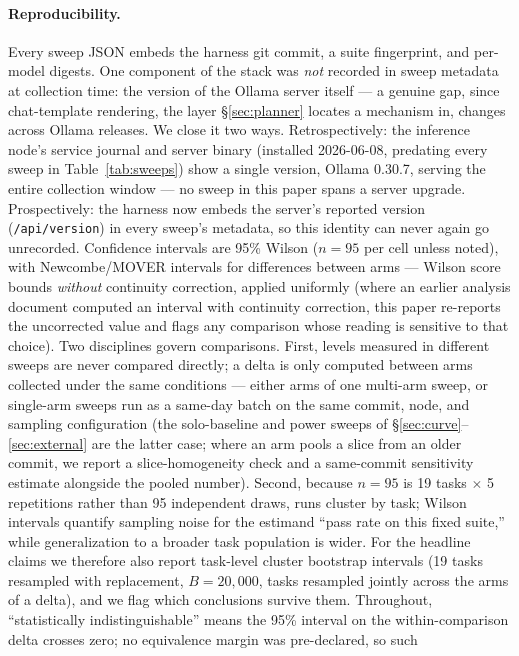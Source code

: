 \documentclass[smallcondensed,natbib]{svjour3}
\begin{document}
\paragraph{Reproducibility.} Every sweep JSON embeds the harness git
commit, a suite fingerprint, and per-model digests. One component of
the stack was \emph{not} recorded in sweep metadata at collection
time: the version of the Ollama server itself --- a genuine gap, since
chat-template rendering, the layer \S\ref{sec:planner} locates a
mechanism in, changes across Ollama releases. We close it two ways.
Retrospectively: the inference node's service journal and server
binary (installed 2026-06-08, predating every sweep in
Table~\ref{tab:sweeps}) show a single version, Ollama 0.30.7, serving
the entire collection window --- no sweep in this paper spans a server
upgrade. Prospectively: the harness now embeds the server's reported
version (\texttt{/api/version}) in every sweep's metadata, so this
identity can never again go unrecorded. Confidence
intervals are 95\% Wilson ($n{=}95$ per cell unless noted), with
Newcombe/MOVER intervals for differences between arms --- Wilson score
bounds \emph{without} continuity correction, applied uniformly (where
an earlier analysis document computed an interval with continuity
correction, this paper re-reports the uncorrected value and flags any
comparison whose reading is sensitive to that choice). Two disciplines
govern comparisons. First, levels measured in different sweeps are
never compared directly; a delta is only computed between arms
collected under the same conditions --- either arms of one multi-arm
sweep, or single-arm sweeps run as a same-day batch on the same commit,
node, and sampling configuration (the solo-baseline and power sweeps of
\S\ref{sec:curve}--\ref{sec:external} are the latter case; where an arm
pools a slice from an older commit, we report a slice-homogeneity check
and a same-commit sensitivity estimate alongside the pooled number).
Second, because $n{=}95$ is 19 tasks $\times$ 5 repetitions rather than
95 independent draws, runs cluster by task; Wilson intervals quantify
sampling noise for the estimand ``pass rate on this fixed suite,''
while generalization to a broader task population is wider. For the
headline claims we therefore also report task-level cluster bootstrap
intervals (19 tasks resampled with replacement, $B{=}20{,}000$, tasks
resampled jointly across the arms of a delta), and we flag which
conclusions survive them. Throughout, ``statistically
indistinguishable'' means the 95\% interval on the within-comparison
delta crosses zero; no equivalence margin was pre-declared, so such
\end{document}

